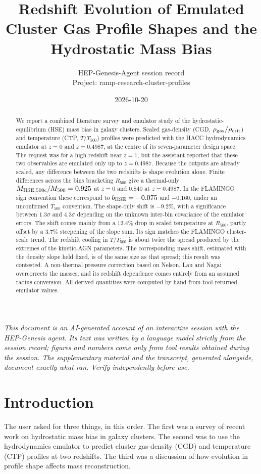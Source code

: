 \documentclass[11pt,a4paper]{article}
\title{Redshift Evolution of Emulated Cluster Gas Profile Shapes and the Hydrostatic Mass Bias}
\author{HEP-Genesis-Agent session record \\ \small Project: ramp-research-cluster-profiles}
\date{2026-10-20}
\begin{document}
\maketitle
\noindent\textit{\small This document is an AI-generated account of an interactive session with the HEP-Genesis agent. Its text was written by a language model strictly from the session record; figures and numbers come only from tool results obtained during the session. The supplementary material and the transcript, generated alongside, document exactly what ran. Verify independently before use.}
\vspace{1em}

\begin{abstract}
We report a combined literature survey and emulator study of the hydrostatic-equilibrium (HSE) mass bias in galaxy clusters. Scaled gas-density (CGD, $\rho_{\rm gas}/\rho_{\rm crit}$) and temperature (CTP, $T/T_{500}$) profiles were predicted with the HACC hydrodynamics emulator at $z=0$ and $z=0.4987$, at the centre of its seven-parameter design space. The request was for a high redshift near $z=1$, but the assistant reported that these two observables are emulated only up to $z=0.4987$. Because the outputs are already scaled, any difference between the two redshifts is shape evolution alone. Finite differences across the bins bracketing $R_{500}$ give a thermal-only $M_{\rm HSE,500c}/M_{500}=0.925$ at $z=0$ and $0.840$ at $z=0.4987$. In the FLAMINGO sign convention these correspond to $b_{\rm HSE}=-0.075$ and $-0.160$, under an unconfirmed $T_{500}$ convention. The shape-only shift is $-9.2\%$, with a significance between $1.3\sigma$ and $4.3\sigma$ depending on the unknown inter-bin covariance of the emulator errors. The shift comes mainly from a $12.4\%$ drop in scaled temperature at $R_{500}$, partly offset by a $3.7\%$ steepening of the slope sum. Its sign matches the FLAMINGO cluster-scale trend. The redshift cooling in $T/T_{500}$ is about twice the spread produced by the extremes of the kinetic-AGN parameters. The corresponding mass shift, estimated with the density slope held fixed, is of the same size as that spread; this result was contested. A non-thermal pressure correction based on Nelson, Lau and Nagai overcorrects the masses, and its redshift dependence comes entirely from an assumed radius conversion. All derived quantities were computed by hand from tool-returned emulator values.
\end{abstract}

\section{Introduction}
The user asked for three things, in this order. The first was a survey of recent work on hydrostatic mass bias in galaxy clusters. The second was to use the hydrodynamics emulator to predict cluster gas-density (CGD) and temperature (CTP) profiles at two redshifts. The third was a discussion of how evolution in profile shape affects mass reconstruction.
\end{document}
